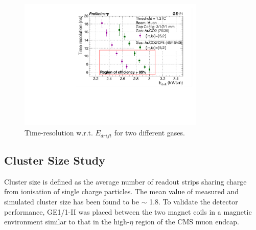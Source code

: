 \begin{figure}[!h]
\centering
\includegraphics[width=3.5in]{figures/GEM/TimeResolution_wrt_EDrift.pdf}
\caption{Time-resolution w.r.t. $E_{drift}$ for two different gases.}
\label{TimeResolution}
\end{figure}



% 

\subsection{Cluster Size Study}

Cluster size is defined as the average number of readout strips sharing charge from ionisation of single charge particles. The mean value of measured and simulated cluster size has been found to be $\sim$ 1.8. To validate the detector performance, GE1/1-II was placed between the two magnet coils in a magnetic environment similar to that in the high-$\eta$ region of the CMS muon endcap.

